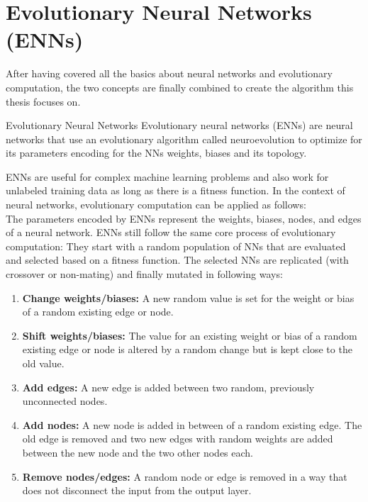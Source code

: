 \section{Evolutionary Neural Networks (ENNs)}\label{sec:evolutionary-neural-networks-(enns)}
After having covered all the basics about neural networks and evolutionary computation, the two concepts are finally combined to create the algorithm this thesis focuses on.
\begin{mydef}{Evolutionary Neural Networks}
    Evolutionary neural networks (ENNs) are neural networks that use an evolutionary algorithm called neuroevolution to optimize for its parameters encoding for the NNs weights, biases and its topology.\cite{enn22, neuroevolution19}
\end{mydef}
ENNs are useful for complex machine learning problems and also work for unlabeled training data as long as there is a fitness function.
In the context of neural networks, evolutionary computation can be applied as follows:
\\
The parameters encoded by ENNs represent the weights, biases, nodes, and edges of a neural network.
ENNs still follow the same core process of evolutionary computation:
They start with a random population of NNs that are evaluated and selected based on a fitness function.
The selected NNs are replicated (with crossover or non-mating) and finally mutated in following ways:
\begin{enumerate}
    \item \textbf{Change weights/biases:} A new random value is set for the weight or bias of a random existing edge or node.
    \item \textbf{Shift weights/biases:} The value for an existing weight or bias of a random existing edge or node is altered by a random change but is kept close to the old value.
    \item \textbf{Add edges:} A new edge is added between two random, previously unconnected nodes.
    \item \textbf{Add nodes:} A new node is added in between of a random existing edge. The old edge is removed and two new edges with random weights are added between the new node and the two other nodes each.
    \item \textbf{Remove nodes/edges:} A random node or edge is removed in a way that does not disconnect the input from the output layer.
\end{enumerate}


